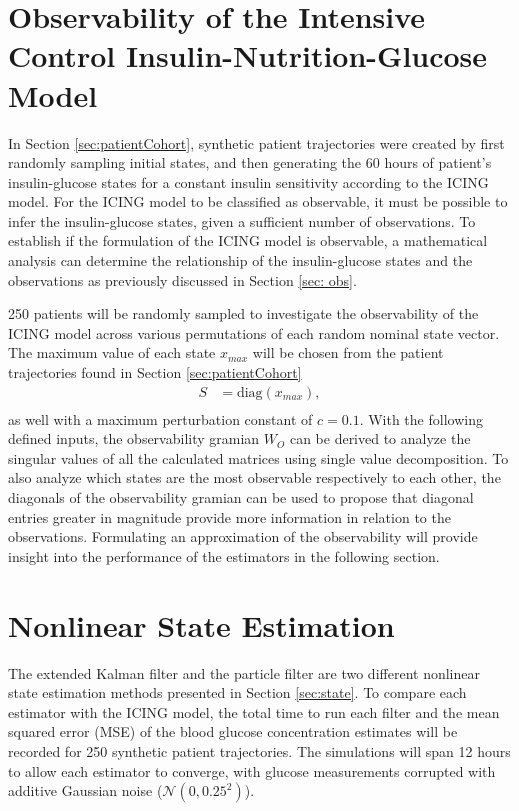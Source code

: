\documentclass[nomenclature, english, bibtex]{kththesis}
\begin{document}
\section{Observability of the Intensive Control Insulin-Nutrition-Glucose Model}
In Section \ref{sec:patientCohort}, synthetic patient trajectories were created by first randomly sampling initial states, and then generating the 60 hours of patient's insulin-glucose states for a constant insulin sensitivity according to the \gls{ICING} model. For the \gls{ICING} model to be classified as observable, it must be possible to infer the insulin-glucose states, given a sufficient number of observations. To establish if the formulation of the \gls{ICING} model is observable, a mathematical analysis can determine the relationship of the insulin-glucose states and the observations as previously discussed in Section \ref{sec: obs}.

250 patients will be randomly sampled to investigate the observability of the \gls{ICING} model across various permutations of each random nominal state vector.
The maximum value of each state $x_{max}$ will be chosen from the patient trajectories found in Section \ref{sec:patientCohort}
\begin{equation}
\begin{aligned}
S &= \mathrm{diag}(x_{max}), \\
\end{aligned}
\end{equation}
as well with a maximum perturbation constant of $c=0.1$. With the following defined inputs, the observability gramian $W_O$ can be derived to analyze the singular values of all the calculated matrices using single value decomposition. To also analyze which states are the most observable respectively to each other, the diagonals of the observability gramian can be used to propose that diagonal entries greater in magnitude provide more information in relation to the observations. Formulating an approximation of the observability will provide insight into the performance of the estimators in the following section. 

\section{Nonlinear State Estimation}
The extended Kalman filter and the particle filter are two different nonlinear state estimation methods presented in Section \ref{sec:state}. To compare each estimator with the \gls{ICING} model, the total time to run each filter and the mean squared error (\gls{MSE}) of the blood glucose concentration estimates will be recorded for 250 synthetic patient trajectories. The simulations will span 12 hours to allow each estimator to converge, with glucose measurements corrupted with additive Gaussian noise ($\mathcal{N}(0,0.25^2)$). 
\end{document}
